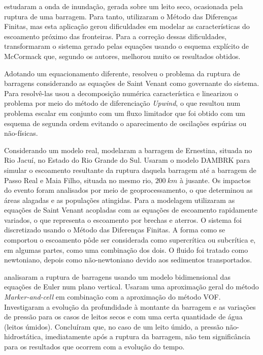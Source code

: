  estudaram a onda de inundação, gerada sobre um leito seco, ocasionada pela ruptura de uma barragem. Para tanto, utilizaram o Método das Diferenças Finitas, mas esta aplicação gerou dificuldades em modelar as características do escoamento próximo das fronteiras. Para a correção dessas dificuldades, transformaram o sistema gerado pelas equações usando o esquema explícito de McCormack que, segundo os autores, melhorou muito os resultados obtidos.

Adotando um equacionamento diferente,  resolveu o problema da ruptura de barragens considerando as equações de Saint Venant como governante do sistema. Para resolvê-las usou a decomposição numérica característica e linearizou o problema por meio do método de diferenciação \textit{Upwind}, o que resultou num problema escalar em conjunto com um fluxo limitador que foi obtido com um esquema de segunda ordem evitando o aparecimento de oscilações espúrias ou não-físicas.

Considerando um modelo real,  modelaram a barragem de Ernestina, situada no Rio Jacuí, no Estado do Rio Grande do Sul. Usaram o modelo DAMBRK para simular o escoamento resultante da ruptura daquela barragem até a barragem de Passo Real e Maia Filho, situada no mesmo rio, $200 \ km$ à jusante. Os impactos do evento foram analisados por meio de geoprocessamento, o que determinou as áreas alagadas e as populações atingidas. Para a modelagem utilizaram as equações de Saint Venant acopladas com as equações de escoamento rapidamente variados, o que representa o escoamento por brechas e aterros. O sistema foi discretizado usando o Método das Diferenças Finitas. A forma como se comportou o escoamento pôde ser considerada como supercrítica ou subcrítica e, em algumas partes, como uma combinação dos dois. O fluido foi tratado como newtoniano, depois como não-newtoniano devido aos sedimentos transportados.

 analisaram a ruptura de barragens usando um modelo bidimensional das equações de Euler num plano vertical. Usaram uma aproximação geral do método \textit{Marker-and-cell} em combinação  com a aproximação do método VOF. Investigaram a evolução da profundidade à montante da barragem e as variações de pressão para os casos de leitos secos e com uma certa quantidade de água (leitos úmidos). Concluíram que, no caso de um leito úmido, a pressão não-hidrostática, imediatamente após a ruptura da barragem, não tem significância para os resultados que ocorrem com a evolução do tempo.

